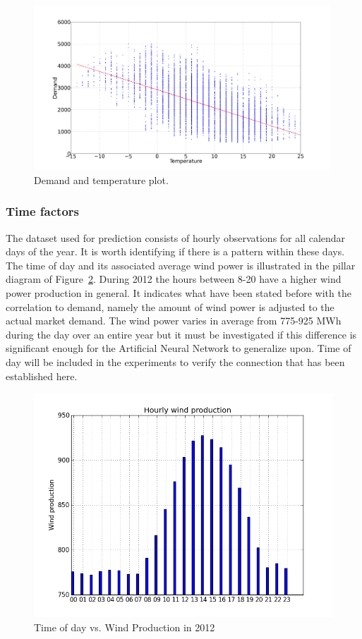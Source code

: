 \begin{figure}[h!]
\centering
\includegraphics[width=0.99\textwidth]{billeder/energy_price_plots/consump_temp.png}
\caption{Demand and temperature plot.}
\label{fig:consump_temp_green}
\end{figure}

\subsubsection{Time factors}
\label{sec:windProdSeasonality}
The dataset used for prediction consists of hourly observations for all calendar days of the year. It is worth identifying if there is a pattern within these days. The time of day and its associated average wind power is illustrated in the pillar diagram of Figure~\ref{fig:hourly_wind_production}. During 2012 the hours between 8-20 have a higher wind power production in general. It indicates what have been stated before with the correlation to demand, namely the amount of wind power is adjusted to the actual market demand. The wind power varies in average from 775-925 MWh during the day over an entire year but it must be investigated if this difference is significant enough for the Artificial Neural Network to generalize upon. Time of day will be included in the experiments to verify the connection that has been established here. 

\begin{figure}[ht!]
\centering
\includegraphics[width=0.8\linewidth]{billeder/hourly_wind_production.png}
\caption{Time of day vs. Wind Production in 2012}
\label{fig:hourly_wind_production}
\end{figure}

